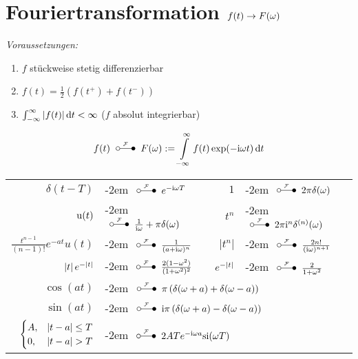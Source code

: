 \documentclass[german,color,5pt]{latex4ei/latex4ei_fs}
\begin{document}
\section{Fouriertransformation \quad $f(t) \rightarrow F(\omega)$}
\begin{sectionbox}
	\emph{Voraussetzungen:}
	\begin{enumerate}
		\item $f$ stückweise stetig differenzierbar
		\item $f(t) = \frac{1}{2}\left(f(t^+) + f(t^-)\right)$
		\item $\int_{-\infty}^{\infty}\abs{f(t)} \diff t < \infty$ ($f$ absolut integrierbar)
	\end{enumerate}
	\begin{emphbox}\vspace{-5pt}
		\[f(t)\FT F(\omega) := \int\limits_{-\infty}^\infty f(t) \exp(-\i \omega t) \diff t\]
	\end{emphbox}
	\begin{tabular}{rlrl}
		$\delta(t-T)$ & \kern-2em  $\FT e^{-\i \omega T}$                       &                                   $1$ & \kern-2em  $\FT 2\pi \delta(\omega)$            \\
		    $\operatorname{u}(t)$ & \kern-2em  $\FT \frac{1}{\i \omega} + \pi \delta(\omega)$ &                                 $t^n$ & \kern-2em  $\FT 2\pi \i^n \delta^{(n)}(\omega)$ \\
 $\frac{t^{n-1}}{(n-1)!} e^{-at} u(t)$ & \kern-2em  $\FT \frac{1}{(a+\i \omega)^n}$ &               		          $|t^n|$ & \kern-2em  $\FT \frac{2n!}{(\i \omega)^{n+1}}$   \\
 $\left\vert t\right\vert e^{-\left\vert t\right\vert}$ & \kern-2em $\FT \frac{2(1-\omega^2)}{(1+\omega^2)^2}$ & $e^{-\left\vert t\right\vert}$ & \kern-2em $\FT \frac{2}{1+\omega^2}$ \\
	$\cos(at)$ & \multicolumn{3}{l}{\kern-2em $\FT \pi\left(\delta(\omega+a)+\delta(\omega-a)\right)$}\\
	$\sin(at)$ & \multicolumn{3}{l}{\kern-2em $\FT \i\pi\left(\delta(\omega+a)-\delta(\omega-a)\right)$}\\
	$\begin{cases}
	A, & \left\vert t-a\right\vert\le T \\
	0, & \left\vert t-a\right\vert >  T
	\end{cases}$ & \multicolumn{3}{l}{\kern-2em $\FT 2ATe^{-\i\omega a} \mathrm{si}(\omega T)$}
	\end{tabular}

\end{sectionbox}
\end{document}
